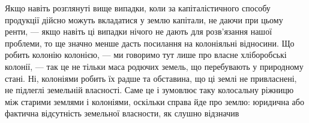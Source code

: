 Якщо навіть розглянуті вище випадки, коли за капіталістичного способу
продукції дійсно можуть вкладатися у землю капітали, не даючи при цьому
ренти, — якщо навіть ці випадки нічого не дають для розв’язання нашої проблеми,
то ще значно менше дасть посилання на колоніяльні відносини. Що робить
колонію колонією, — ми говоримо тут лише про власне хліборобські колонії,
— так це не тільки маса родючих земель, що перебувають у природному
стані. Ні, колоніями робить їх радше та обставина, що ці землі не привласнені,
не підлеглі земельній власності. Саме це і зумовлює таку колосальну ріжницю
між старими землями і колоніями, оскільки справа йде про землю:
юридична або фактична відсутність земельної власности, як слушно відзначив
\parbreak{}  %

